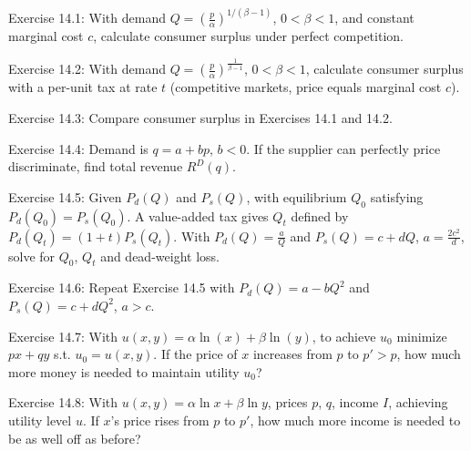 \begin{original}
Exercise 14.1: With demand $Q = \left(\frac{p}{\alpha}\right)^{1/(\beta-1)}$, $0 < \beta < 1$, and constant marginal cost $c$, calculate consumer surplus under perfect competition.

Exercise 14.2: With demand $Q = \left(\frac{p}{\alpha}\right)^{\frac{1}{\beta-1}}$, $0 < \beta < 1$, calculate consumer surplus with a per-unit tax at rate $t$ (competitive markets, price equals marginal cost $c$).

Exercise 14.3: Compare consumer surplus in Exercises 14.1 and 14.2.

Exercise 14.4: Demand is $q = a + bp$, $b < 0$. If the supplier can perfectly price discriminate, find total revenue $R^D(q)$.

Exercise 14.5: Given $P_d(Q)$ and $P_s(Q)$, with equilibrium $Q_0$ satisfying $P_d(Q_0) = P_s(Q_0)$. A value-added tax gives $Q_t$ defined by $P_d(Q_t) = (1+t)P_s(Q_t)$. With $P_d(Q) = \frac{a}{Q}$ and $P_s(Q) = c + dQ$, $a = \frac{2c^2}{d}$, solve for $Q_0$, $Q_t$ and dead-weight loss.

Exercise 14.6: Repeat Exercise 14.5 with $P_d(Q) = a - bQ^2$ and $P_s(Q) = c + dQ^2$, $a > c$.

Exercise 14.7: With $u(x, y) = \alpha \ln(x) + \beta \ln(y)$, to achieve $u_0$ minimize $px + qy$ s.t. $u_0 = u(x, y)$. If the price of $x$ increases from $p$ to $p' > p$, how much more money is needed to maintain utility $u_0$?

Exercise 14.8: With $u(x, y) = \alpha \ln x + \beta \ln y$, prices $p$, $q$, income $I$, achieving utility level $u$. If $x$'s price rises from $p$ to $p'$, how much more income is needed to be as well off as before?
\end{original}
